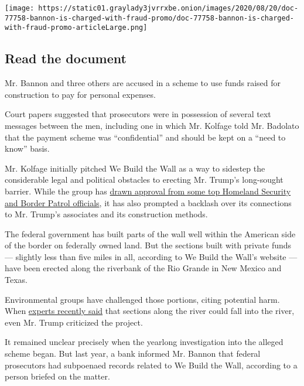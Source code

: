 \href{https://www.nytimes3xbfgragh.onion/interactive/2020/08/20/us/20bannon-indictment-doc.html}{}

\texttt{[image: https://static01.graylady3jvrrxbe.onion/images/2020/08/20/doc-77758-bannon-is-charged-with-fraud-promo/doc-77758-bannon-is-charged-with-fraud-promo-articleLarge.png]}

\hypertarget{read-the-document}{%
\subsection{Read the document}\label{read-the-document}}

Mr. Bannon and three others are accused in a scheme to use funds raised
for construction to pay for personal expenses.

Court papers suggested that prosecutors were in possession of several
text messages between the men, including one in which Mr. Kolfage told
Mr. Badolato that the payment scheme was ``confidential'' and should be
kept on a ``need to know'' basis.

Mr. Kolfage initially pitched We Build the Wall as a way to sidestep the
considerable legal and political obstacles to erecting Mr. Trump's
long-sought barrier. While the group has
\href{https://www.nytimes3xbfgragh.onion/2020/08/20/us/politics/bannon-we-build-the-wall.html}{drawn
approval from some top Homeland Security and Border Patrol officials},
it has also prompted a backlash over its connections to Mr. Trump's
associates and its construction methods.

The federal government has built parts of the wall well within the
American side of the border on federally owned land. But the sections
built with private funds --- slightly less than five miles in all,
according to We Build the Wall's website --- have been erected along the
riverbank of the Rio Grande in New Mexico and Texas.

Environmental groups have challenged those portions, citing potential
harm. When
\href{https://www.propublica.org/article/he-built-a-privately-funded-border-wall-its-already-at-risk-of-falling-down-if-not-fixed}{experts
recently said} that sections along the river could fall into the river,
even Mr. Trump criticized the project.

It remained unclear precisely when the yearlong investigation into the
alleged scheme began. But last year, a bank informed Mr. Bannon that
federal prosecutors had subpoenaed records related to We Build the Wall,
according to a person briefed on the matter.


